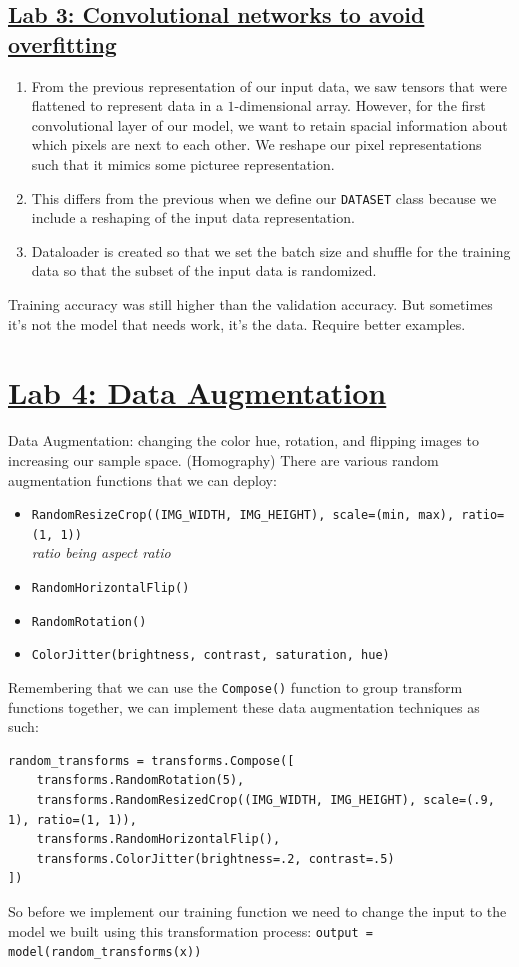 \documentclass{article}
\begin{document}
\subsection{\href{http://dli-e5d62e622240-a8611b.westus3.cloudapp.azure.com/lab/lab/tree/03_asl_cnn.ipynb}{Lab 3: Convolutional networks to avoid overfitting}}
\begin{enumerate}
    \item From the previous representation of our input data, we saw tensors that were flattened to represent data in a $1$-dimensional array. However, for the first convolutional layer of our model, we want to retain spacial information about which pixels are next to each other. We reshape our pixel representations such that it mimics some picturee representation. 
    \item This differs from the previous when we define our \verb|DATASET| class because we include a reshaping of the input data representation.
    \item Dataloader is created so that we set the batch size and shuffle for the training data so that the subset of the input data is randomized.
\end{enumerate}
Training accuracy was still higher than the validation accuracy. But sometimes it's not the model that needs work, it's the data. Require better examples. 

\section{\href{http://dli-e5d62e622240-a8611b.westus3.cloudapp.azure.com/lab/lab/tree/04a_asl_augmentation.ipynb}{Lab 4: Data Augmentation}}
Data Augmentation: changing the color hue, rotation, and flipping images to increasing our sample space. (Homography)
There are various random augmentation functions that we can deploy: 
\begin{itemize}
    \item \verb|RandomResizeCrop((IMG_WIDTH, IMG_HEIGHT), scale=(min, max), ratio=(1, 1))|\\
        \textit{ratio being aspect ratio}
    \item \verb|RandomHorizontalFlip()|
    \item \verb|RandomRotation()|
    \item \verb|ColorJitter(brightness, contrast, saturation, hue)|
\end{itemize}
Remembering that we can use the \verb|Compose()| function to group transform functions together, we can implement these data augmentation techniques as such: 
\begin{verbatim}
random_transforms = transforms.Compose([
    transforms.RandomRotation(5),
    transforms.RandomResizedCrop((IMG_WIDTH, IMG_HEIGHT), scale=(.9, 1), ratio=(1, 1)),
    transforms.RandomHorizontalFlip(),
    transforms.ColorJitter(brightness=.2, contrast=.5)
])
\end{verbatim}
So before we implement our training function we need to change the input to the model we built using this transformation process: \verb|output = model(random_transforms(x))| 
\end{document}
